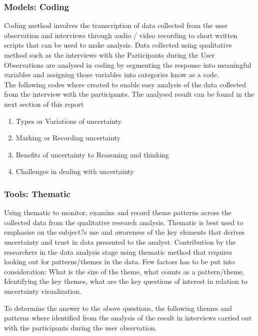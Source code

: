 \documentclass[journal]{vgtc}                %
\begin{document}
\subsubsection{Models: Coding}
Coding method involves the transcription of data collected from the user observation and interviews through audio / video recording to short written scripts that can be used to make analysis. Data collected using qualitative method such as the interviews with the Participants during the User Observations are analysed in coding by segmenting the response into meaningful variables and assigning those variables into categories know as a code.\\

The following codes where created to enable easy analysis of the data collected from the interview with the participants. The analysed result can be found in the next section of this report

\begin{enumerate}
  \item Types or Variations of uncertainty
  \item Marking or Recording uncertainty
  \item Benefits of uncertainty to Reasoning and thinking
  \item Challenges in dealing with uncertainty
\end{enumerate}

\subsubsection{Tools: Thematic}
Using thematic to monitor, examine and record theme patterns across the collected data from the qualitative research analysis.
Thematic is best used to emphasise on the subject?s use and awareness of the key elements that derives uncertainty and trust in data presented to the analyst.
Contribution by the researchers in the data analysis stage using thematic method that requires looking out for patterns/themes in the data. Few factors has to be put into consideration: What is the size of the theme, what counts as a pattern/theme, Identifying the key themes, what are the key questions of interest in relation to uncertainty visualization.

To determine the answer to the above questions, the following themes and patterns where identified from the analysis of the result in interviews carried out with the participants during the user observation.
\end{document}
